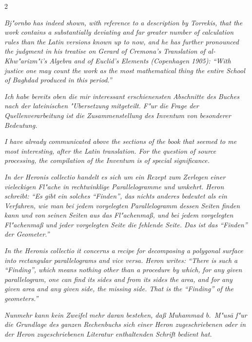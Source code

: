 \documentclass[10pt,a4paper]{article}
\newcommand{\enquote}[1]{``#1''}
\begin{document}
\begin{paracol}{2}
\switchcolumn

\textit{Bj"ornbo has indeed shown, with reference to a description by Torrekis, that the work contains a substantially deviating and far greater number of calculation rules than the Latin versions known up to now, and he has further pronounced the judgment in his treatise on \textit{Gerard of Cremona's Translation of al-Khw"arizm"i's Algebra and of Euclid's Elements} (Copenhagen 1905): \enquote{With justice one may count the work as the most mathematical thing the entire \textit{School of Baghdad} produced in this period.}}

\switchcolumn*

\textit{Ich habe bereits oben die mir interessant erschienensten Abschnitte des Buches nach der lateinischen "Ubersetzung mitgeteilt. F"ur die Frage der Quellenverarbeitung ist die Zusammenstellung des \textit{Inventum} von besonderer Bedeutung.}

\switchcolumn

\textit{I have already communicated above the sections of the book that seemed to me most interesting, after the Latin translation. For the question of source processing, the compilation of the \textit{Inventum} is of special significance.}

\switchcolumn*

\textit{In der \textit{Heronis collectio} handelt es sich um ein Rezept zum Zerlegen einer vieleckigen Fl"ache in rechtwinklige Parallelogramme und umkehrt. Heron schreibt: \enquote{Es gibt ein solches \enquote{Finden}, das nichts anderes bedeutet als ein Verfahren, wie man bei jedem vorgelegten Parallelogramm dessen Seiten finden kann und von seinen Seiten aus das Fl"achenma\ss{}, und bei jedem vorgelegten Fl"achenma\ss{} und jeder vorgelegten Seite die fehlende Seite. Das ist das \enquote{Finden} der Geometer.}}

\switchcolumn

\textit{In the \textit{Heronis collectio} it concerns a recipe for decomposing a polygonal surface into rectangular parallelograms and vice versa. Heron writes: \enquote{There is such a \enquote{Finding}, which means nothing other than a procedure by which, for any given parallelogram, one can find its sides and from its sides the area, and for any given area and any given side, the missing side. That is the \enquote{Finding} of the geometers.}}

\switchcolumn*

\textit{Nunmehr kann kein Zweifel mehr daran bestehen, da\ss{} Muhammad b.\ M"us\=a f"ur die Grundlage des ganzen Rechenbuchs sich einer Heron zugeschriebenen oder in der Heron zugeschriebenen Literatur enthaltenden Schrift bedient hat.}


\end{paracol}
\end{document}
